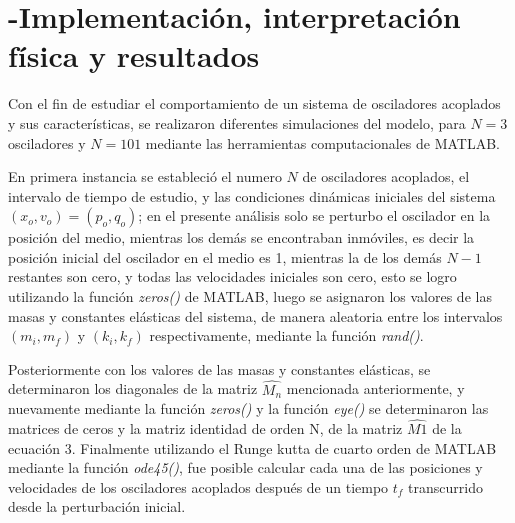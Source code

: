 \documentclass[11pt,letterpaper,twocolumn]{article}
\begin{document}
\section*{-Implementación, interpretación física y resultados}
Con el fin de estudiar el comportamiento de un sistema de osciladores acoplados y sus características, se realizaron diferentes simulaciones del modelo, para $N=3$ osciladores y $N=101$ mediante las herramientas computacionales de MATLAB.\\
\par 
En primera instancia se estableció el numero $N$ de osciladores acoplados, el intervalo de tiempo de estudio, y las condiciones dinámicas iniciales del sistema $(x_{o},v_{o})=(p_{o},q_{o})$; en el presente análisis solo se perturbo el oscilador en la posición del medio, mientras los demás se encontraban inmóviles, es decir la posición inicial del oscilador en el medio es 1, mientras la de los demás $N-1$ restantes son cero, y todas las velocidades iniciales son cero, esto se logro utilizando la función \textit{zeros()} de MATLAB, luego se asignaron los valores de las masas y constantes elásticas del sistema, de manera aleatoria entre los intervalos $(m_{i},m_{f})$ y $(k_{i},k_{f})$ respectivamente, mediante la función \textit{rand()}.\\ 
\par 
Posteriormente con los valores de las masas y constantes elásticas, se determinaron los diagonales de la matriz $\hat{M_{n}}$ mencionada anteriormente, y nuevamente mediante la función \textit{zeros()} y la función \textit{eye()} se determinaron las matrices de ceros y la matriz identidad de orden N, de la matriz $\hat{M1}$ de la ecuación 3. Finalmente utilizando el Runge kutta de cuarto orden de MATLAB mediante la función \textit{ode45()}, fue posible calcular cada una de las posiciones y velocidades de los osciladores acoplados después de un tiempo $t_{f}$ transcurrido desde la perturbación inicial.
\end{document}

